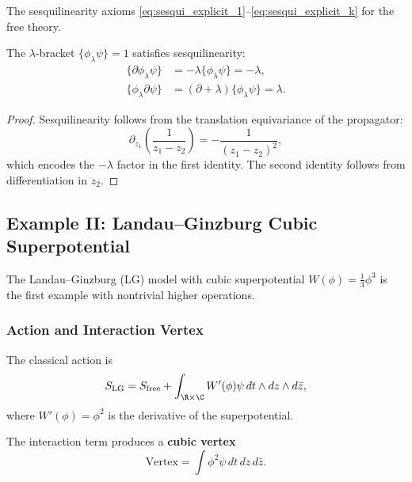 The sesquilinearity axioms \eqref{eq:sesqui_explicit_1}--\eqref{eq:sesqui_explicit_k} for the free theory.
\begin{lemma}
\label{lem:free_sesquilinearity}
The $\lambda$-bracket $\{\phi_\lambda \psi\} = 1$ satisfies sesquilinearity:
\begin{align}
\{\partial \phi_\lambda \psi\} &= -\lambda \{\phi_\lambda \psi\} = -\lambda, \\
\{\phi_\lambda \partial \psi\} &= (\partial + \lambda) \{\phi_\lambda \psi\} = \lambda.
\end{align}
\end{lemma}

\begin{proof}
Sesquilinearity follows from the translation equivariance of the propagator:
\begin{equation}
\partial_{z_1} \left( \frac{1}{z_1 - z_2} \right) = -\frac{1}{(z_1 - z_2)^2},
\end{equation}
which encodes the $-\lambda$ factor in the first identity. The second identity follows from differentiation in $z_2$.
\end{proof}

\subsection{Example II: Landau--Ginzburg Cubic Superpotential}
\label{lem:LG_cubic_complete}

The Landau--Ginzburg (LG) model with cubic superpotential $W(\phi) = \frac{1}{3} \phi^3$ is the first example with nontrivial higher operations.

\subsubsection{Action and Interaction Vertex}

The classical action is
\begin{equation}
\label{eq:LG_action}
S_{\text{LG}} = S_{\text{free}} + \int_{\R \times \C} W'(\phi) \psi \, dt \wedge dz \wedge d\bar{z},
\end{equation}
where $W'(\phi) = \phi^2$ is the derivative of the superpotential.

The interaction term produces a \textbf{cubic vertex}
\begin{equation}
\text{Vertex} = \int \phi^2 \psi \, dt \, dz \, d\bar{z}.
\end{equation}


